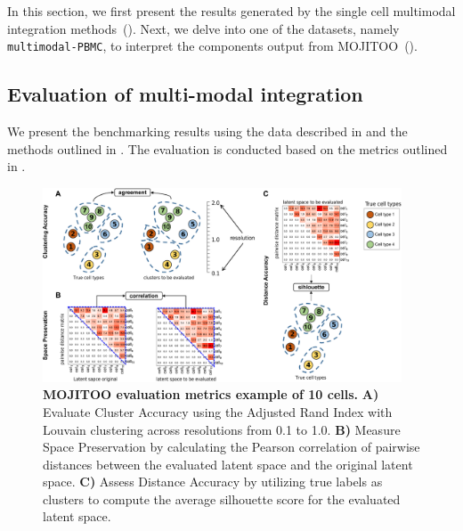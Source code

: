 In this section, we first present the results generated by the single cell multimodal integration methods~(). Next, we delve into one of the datasets, namely \texttt{multimodal-PBMC}, to interpret the components output from MOJITOO~().

\subsection{Evaluation of multi-modal integration}
\label{MOJITOO:out:bench}

We present the benchmarking results using the data described in  and the methods outlined in . The evaluation is conducted based on the metrics outlined in .

\begin{figure}[!ht]
	\centering
	\includegraphics[width=0.95\textwidth]{MOJITOO_bench_metrics/fig}
	\vspace{0.1cm}
	\caption[MOJITOO evaluation metrics example]{
	\textbf{MOJITOO evaluation metrics example of 10 cells.}  \textbf{A)} Evaluate Cluster Accuracy using the Adjusted Rand Index with Louvain clustering across resolutions from 0.1 to 1.0. \textbf{B)} Measure Space Preservation by calculating the Pearson correlation of pairwise distances between the evaluated latent space and the original latent space. \textbf{C)} Assess Distance Accuracy by utilizing true labels as clusters to compute the average silhouette score for the evaluated latent space.}
	\label{fig:bench_metrics}
\end{figure}

